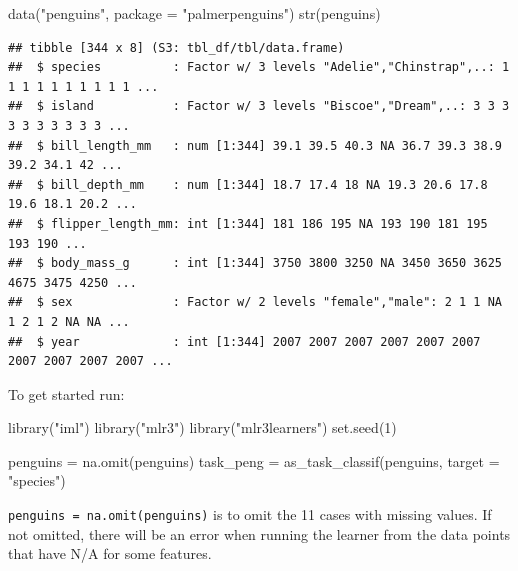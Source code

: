 \documentclass[
]{scrbook}
\newenvironment{Shaded}{\begin{snugshade}}{\end{snugshade}}
\newcommand{\AttributeTok}[1]{\textcolor[rgb]{0.77,0.63,0.00}{#1}}
\newcommand{\DecValTok}[1]{\textcolor[rgb]{0.00,0.00,0.81}{#1}}
\newcommand{\FunctionTok}[1]{\textcolor[rgb]{0.00,0.00,0.00}{#1}}
\newcommand{\NormalTok}[1]{#1}
\newcommand{\OtherTok}[1]{\textcolor[rgb]{0.56,0.35,0.01}{#1}}
\newcommand{\StringTok}[1]{\textcolor[rgb]{0.31,0.60,0.02}{#1}}
\renewenvironment{Shaded} {\begin{snugshade}\small} {\end{snugshade}}
\begin{document}
\begin{Shaded}
\begin{Highlighting}[]
\FunctionTok{data}\NormalTok{(}\StringTok{"penguins"}\NormalTok{, }\AttributeTok{package =} \StringTok{"palmerpenguins"}\NormalTok{)}
\FunctionTok{str}\NormalTok{(penguins)}
\end{Highlighting}
\end{Shaded}

\begin{verbatim}
## tibble [344 x 8] (S3: tbl_df/tbl/data.frame)
##  $ species          : Factor w/ 3 levels "Adelie","Chinstrap",..: 1 1 1 1 1 1 1 1 1 1 ...
##  $ island           : Factor w/ 3 levels "Biscoe","Dream",..: 3 3 3 3 3 3 3 3 3 3 ...
##  $ bill_length_mm   : num [1:344] 39.1 39.5 40.3 NA 36.7 39.3 38.9 39.2 34.1 42 ...
##  $ bill_depth_mm    : num [1:344] 18.7 17.4 18 NA 19.3 20.6 17.8 19.6 18.1 20.2 ...
##  $ flipper_length_mm: int [1:344] 181 186 195 NA 193 190 181 195 193 190 ...
##  $ body_mass_g      : int [1:344] 3750 3800 3250 NA 3450 3650 3625 4675 3475 4250 ...
##  $ sex              : Factor w/ 2 levels "female","male": 2 1 1 NA 1 2 1 2 NA NA ...
##  $ year             : int [1:344] 2007 2007 2007 2007 2007 2007 2007 2007 2007 2007 ...
\end{verbatim}

To get started run:

\begin{Shaded}
\begin{Highlighting}[]
\FunctionTok{library}\NormalTok{(}\StringTok{"iml"}\NormalTok{)}
\FunctionTok{library}\NormalTok{(}\StringTok{"mlr3"}\NormalTok{)}
\FunctionTok{library}\NormalTok{(}\StringTok{"mlr3learners"}\NormalTok{)}
\FunctionTok{set.seed}\NormalTok{(}\DecValTok{1}\NormalTok{)}
\end{Highlighting}
\end{Shaded}

\begin{Shaded}
\begin{Highlighting}[]
\NormalTok{penguins }\OtherTok{=} \FunctionTok{na.omit}\NormalTok{(penguins)}
\NormalTok{task\_peng }\OtherTok{=} \FunctionTok{as\_task\_classif}\NormalTok{(penguins, }\AttributeTok{target =} \StringTok{"species"}\NormalTok{)}
\end{Highlighting}
\end{Shaded}

\texttt{penguins\ =\ na.omit(penguins)} is to omit the 11 cases with missing values.
If not omitted, there will be an error when running the learner from the data points that have N/A for some features.
\end{document}
